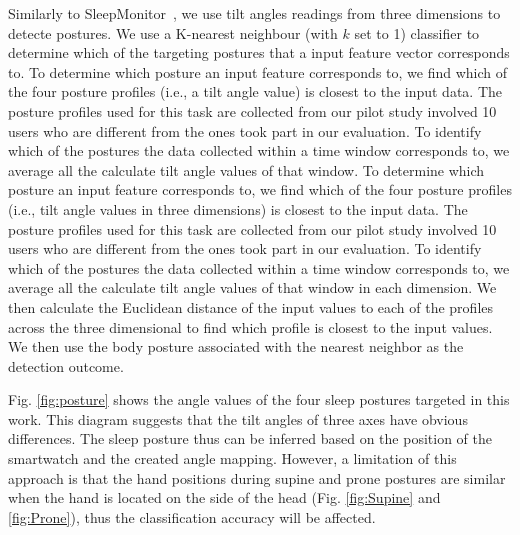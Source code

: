 
Similarly to SleepMonitor~\cite{sleepmonitor}, we use tilt angles readings from three dimensions to detecte postures. We use a K-nearest
neighbour (with $k$ set to 1) classifier to determine which of the targeting postures that a input feature vector corresponds to. To
determine which posture an input feature corresponds to, we find which of the four posture profiles (i.e., a tilt angle value) is closest
to the input data. The posture profiles used for this task are collected from our pilot study involved 10 users who are different from the
ones took part in our evaluation. To identify which of the postures the data collected within a time window corresponds to, we average all
the calculate tilt angle values of that window. To determine which posture an input feature corresponds to, we find which of the four
posture profiles (i.e., tilt angle values in three dimensions) is closest to the input data. The posture profiles used for this task are
collected from our pilot study involved 10 users who are different from the ones took part in our evaluation. To identify which of the
postures the data collected within a time window corresponds to, we average all the calculate tilt angle values of that window in each
dimension. We then calculate the Euclidean distance of the input values to each of the profiles across the three dimensional to find which
profile is closest to the input values. We then use the body posture associated with the nearest neighbor as the detection outcome.




Fig. \ref{fig:posture} shows the angle values of the four sleep postures targeted in this work. This diagram suggests that the tilt angles
of three axes have obvious differences. The sleep posture thus can be inferred based on the position of the smartwatch and the created
angle mapping. However, a limitation of this approach is that the hand positions during supine and prone postures are similar when the hand
is located on the side of the head (Fig. \ref{fig:Supine} and \ref{fig:Prone}), thus the classification accuracy will be affected.

